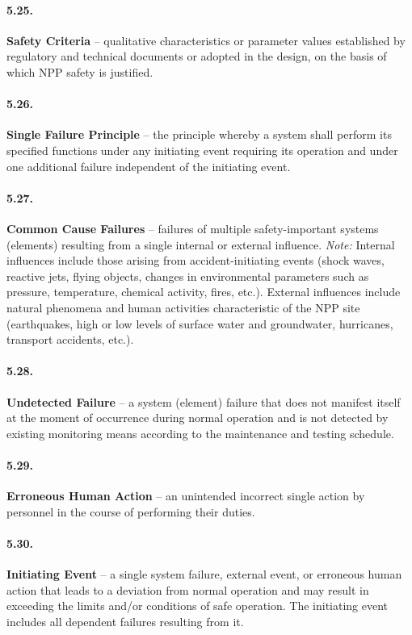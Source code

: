 \documentclass[openright]{bookest}
\begin{document}
\paragraph{5.25.}
\textbf{Safety Criteria} -- qualitative characteristics or parameter values established by regulatory and technical documents or adopted in the design, on the basis of which NPP safety is justified.

\paragraph{5.26.}
\textbf{Single Failure Principle} -- the principle whereby a system shall perform its specified functions under any initiating event requiring its operation and under one additional failure independent of the initiating event.

\paragraph{5.27.}
\textbf{Common Cause Failures} -- failures of multiple safety-important systems (elements) resulting from a single internal or external influence.  
\textit{Note:}  
Internal influences include those arising from accident-initiating events (shock waves, reactive jets, flying objects, changes in environmental parameters such as pressure, temperature, chemical activity, fires, etc.).  
External influences include natural phenomena and human activities characteristic of the NPP site (earthquakes, high or low levels of surface water and groundwater, hurricanes, transport accidents, etc.).

\paragraph{5.28.}
\textbf{Undetected Failure} -- a system (element) failure that does not manifest itself at the moment of occurrence during normal operation and is not detected by existing monitoring means according to the maintenance and testing schedule.

\paragraph{5.29.}
\textbf{Erroneous Human Action} -- an unintended incorrect single action by personnel in the course of performing their duties.

\paragraph{5.30.}
\textbf{Initiating Event} -- a single system failure, external event, or erroneous human action that leads to a deviation from normal operation and may result in exceeding the limits and/or conditions of safe operation.  
The initiating event includes all dependent failures resulting from it.
\end{document}
